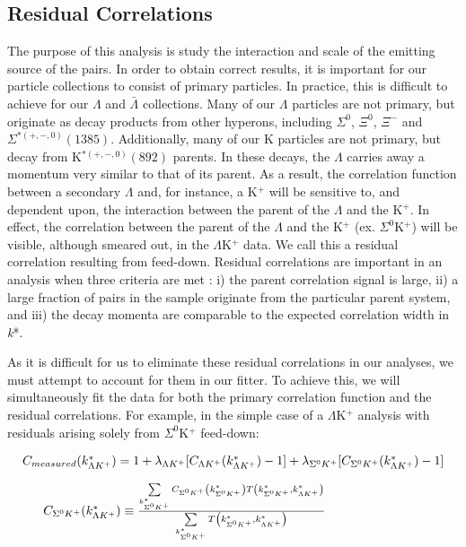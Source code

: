 \documentclass[../AnalysisNoteJBuxton.tex]{subfiles}
\begin{document}
\subsection{Residual Correlations}
\label{ResidualCorrelations}

The purpose of this analysis is study the interaction and scale of the emitting source of the pairs.
In order to obtain correct results, it is important for our particle collections to consist of primary particles.
In practice, this is difficult to achieve for our $\Lambda$ and $\bar{\Lambda}$ collections.
Many of our $\Lambda$ particles are not primary, but originate as decay products from other hyperons, including $\Sigma^{0}$, $\Xi^{0}$, $\Xi^{-}$ and $\Sigma^{*(+,-,0)}(1385)$.  Additionally, many of our K particles are not primary, but decay from K$^{*(+,-,0)}(892)$ parents.
In these decays, the $\Lambda$ carries away a momentum very similar to that of its parent.
As a result, the correlation function between a secondary $\Lambda$ and, for instance, a K$^{+}$  will be sensitive to, and dependent upon, the interaction between the parent of the $\Lambda$ and the K$^{+}$.
In effect, the correlation between the parent of the $\Lambda$ and the K$^{+}$ (ex. $\Sigma^{0}$K$^{+}$) will be visible, although smeared out, in the $\Lambda$K$^{+}$ data.
We call this a residual correlation resulting from feed-down.  Residual correlations are important in an analysis when three criteria are met \cite{Kisiel:2014mma}: i) the parent correlation signal is large, ii) a large fraction of pairs in the sample originate from the particular parent system, and iii) the decay momenta are comparable to the expected correlation width in \textit{k}*. 

As it is difficult for us to eliminate these residual correlations in our analyses, we must attempt to account for them in our fitter.
To achieve this, we will simultaneously fit the data for both the primary correlation function and the residual correlations.  For example, in the simple case of a $\Lambda$K$^{+}$ analysis with residuals arising solely from $\Sigma^{0}$K$^{+}$ feed-down:

\begin{equation}
\begin{array}{l}
\vspace{4mm}
 C_{measured}(k^{*}_{\Lambda K^{+}}) = 1 + \lambda_{\Lambda K^{+}}[C_{\Lambda K^{+}}(k^{*}_{\Lambda K^{+}})-1] + \lambda_{\Sigma^{0}K^{+}}[C_{\Sigma^{0}K^{+}}(k^{*}_{\Lambda K^{+}})-1] \\
\vspace{2mm}
  ~~~~~C_{\Sigma^{0}K^{+}}(k^{*}_{\Lambda K^{+}}) \equiv \frac{\sum\limits_{k^{*}_{\Sigma^{0}K^{+}}} C_{\Sigma^{0}K^{+}}\left(k^{*}_{\Sigma^{0}K^{+}}\right) T\left(k^{*}_{\Sigma^{0}K^{+}},k^{*}_{\Lambda K^{+}}\right)}{\sum\limits_{k^{*}_{\Sigma^{0}K^{+}}} T\left(k^{*}_{\Sigma^{0}K^{+}},k^{*}_{\Lambda K^{+}}\right)}
\end{array} 
\label{eqn:SimpleResiduals}
\end{equation}
\end{document}
